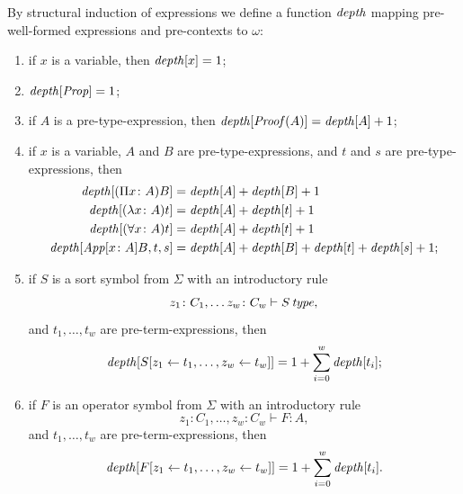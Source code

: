 \begin{definition} 
    By structural induction of expressions we define a function $\operatorname{\mathit{depth}}$ mapping pre-well-formed expressions and pre-contexts to $\omega$:
    \begin{enumerate}
        \item if $x$ is a variable, then $\operatorname{\mathit{depth}}[x] = 1$;
        \item $\operatorname{\mathit{depth}}[\operatorname{\mathit{Prop}}] = 1$;
        \item if $A$ is a pre-type-expression, then $\operatorname{\mathit{depth}}[\operatorname{\mathit{Proof}}(A)] = \operatorname{\mathit{depth}}[A] + 1$;
        \item if $x$ is a variable, $A$ and $B$ are pre-type-expressions, and $t$ and $s$ are pre-type-expressions, then
            \begin{align*}
                \operatorname{\mathit{depth}}[(\Pi x \colon A) B] &= \operatorname{\mathit{depth}}[A] + \operatorname{\mathit{depth}}[B] + 1 \\
                \operatorname{\mathit{depth}}[(\lambda x \colon A) t] &= \operatorname{\mathit{depth}}[A] + \operatorname{\mathit{depth}}[t] + 1 \\
                \operatorname{\mathit{depth}}[(\forall x \colon A) t] &= \operatorname{\mathit{depth}}[A] + \operatorname{\mathit{depth}}[t] + 1 \\
                \operatorname{\mathit{depth}}[\operatorname{\mathit{App}}[x \colon A]B, t, s] &= \operatorname{\mathit{depth}}[A] + \operatorname{\mathit{depth}}[B] + \operatorname{\mathit{depth}}[t] + \operatorname{\mathit{depth}}[s] + 1;
            \end{align*}
        \item if $S$ is a sort symbol from $\Sigma$ with an introductory rule $$z_1 \colon C_1, \dots z_w \colon C_w \vdash S \operatorname{\mathit{\space type}},$$
            and $t_1, \dots, t_w$ are pre-term-expressions, then \[
                \operatorname{\mathit{depth}}[S[z_1  \leftarrow  t_1, \dots, z_w  \leftarrow  t_w]] = 1 + \sum_{i=0}^w \operatorname{\mathit{depth}}[t_i];
            \]
        \item if $F$ is an operator symbol from $\Sigma$ with an introductory rule $$z_1 \colon C_1, \dots, z_w \colon C_w \vdash F \colon A,$$
            and $t_1, \dots, t_w$ are pre-term-expressions, then \[
                \operatorname{\mathit{depth}}[F[z_1  \leftarrow  t_1, \dots, z_w  \leftarrow  t_w]] = 1 + \sum_{i=0}^w \operatorname{\mathit{depth}}[t_i].
            \]
    \end{enumerate}
\end{definition}

